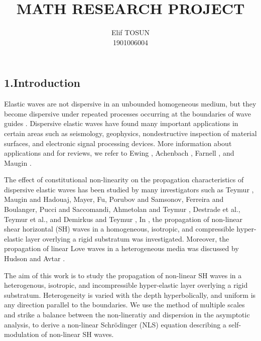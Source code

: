 \documentclass[8pt,a4paper]{article}
\begin{document}
\title{\vspace{5cm}MATH RESEARCH PROJECT}
\author{\vspace{0.5cm}Elif TOSUN\\1901006004}
\maketitle

\newpage
{}
\subsection*{1.Introduction}
Elastic waves are not dispersive in an unbounded homogeneous medium, but they become dispersive under repeated processes occurring at the boundaries of wave guides \cite{ewing1986ws,graff1975wave}. Dispersive elastic waves have found many important applications in certain areas such as seismology, geophysics, nondestructive inspection of material surfaces, and electronic signal processing devices. More information about applications and for reviews, we refer to Ewing \cite{ewing1986ws}, Achenbach \cite{yim1995formulation}, Farnell \cite{adler1990pc}, and Maugin \cite{maugin1983elastic}.\par
The effect of constitutional non-linearity on the propagation characteristics of dispersive elastic waves has been studied by many investigators such as Teymur \cite{teymur1988nonlinear,teymur1996small,teymur2006propagation}, Maugin and Hadouaj\cite{maugin1991solitary}, Mayer\cite{mayer1995surface}, Fu\cite{fu1994propagation}, Porubov and Samsonov\cite{porubov1995long}, Ferreira and Boulanger\cite{ferreira2008large}, Pucci and Saccomandi\cite{pucci2013secondary}, Ahmetolan and Teymur \cite{ahmetolan2003non,ahmetolan2007nonlinear}, Destrade et al.\cite{destrade2011scalar}, Teymur et al.\cite{teymur2014propagation}, and Demirkus and Teymur \cite{demirkus2017shear}, In \cite{demirkus2017shear}, the propagation of non-linear shear horizontal (SH) waves in a homogeneous, isotropic, and compressible hyper-elastic layer overlying a rigid substratum was investigated. Moreover, the propagation of linear Love waves in a heterogeneous media was discussed by Hudson \cite{hudson1962love} and Avtar \cite{avtar1967love}.\par The aim of this work is to study the propagation of non-linear SH waves in a heterogenous, isotropic, and incompressible hyper-elastic layer overlying a rigid substratum. Heterogeneity is varied with the depth hyperbolically, and uniform is any direction parallel to the boundaries. We use the method of multiple scales and strike a balance between the non-lineratiy and dispersion in the asymptotic analysis, to derive a non-linear Schrödinger (NLS) equation describing a self-modulation of non-linear SH waves.  
\end{document}
